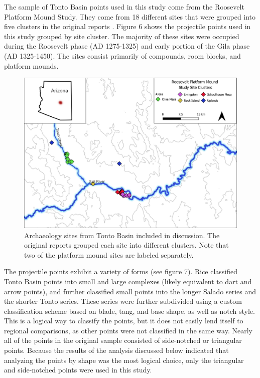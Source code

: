 \documentclass[a4paper]{article}
\begin{document}
The sample of Tonto Basin points used in this study come from the Roosevelt Platform Mound Study. They come from 18 different sites that were grouped into five clusters in the original reports \autocite[see][ for an overview]{Rice1998-ku}. Figure 6 shows the projectile points used in this study grouped by site cluster. The majority of these sites were occupied during the Roosevelt phase (AD 1275-1325) and early portion of the Gila phase (AD 1325-1450). The sites consist primarily of compounds, room blocks, and platform mounds.

\begin{figure}
\includegraphics[width=1\linewidth]{figures/TontoBasinSitesv2} \caption{Archaeology sites from Tonto Basin included in discussion. The original reports grouped each site into different clusters. Note that two of the platform mound sites are labeled separately.}\label{fig:TontoBasinSites}
\end{figure}

The projectile points exhibit a variety of forms (see figure 7). Rice \autocite*{Rice1994-rk} classified Tonto Basin points into small and large complexes (likely equivalent to dart and arrow points), and further classified small points into the longer Salado series and the shorter Tonto series. These series were further subdivided using a custom classification scheme based on blade, tang, and base shape, as well as notch style. This is a logical way to classify the points, but it does not easily lend itself to regional comparisons, as other points were not classified in the same way. Nearly all of the points in the original sample consisted of side-notched or triangular points. Because the results of the analysis discussed below indicated that analyzing the points by shape was the most logical choice, only the triangular and side-notched points were used in this study.
\end{document}
